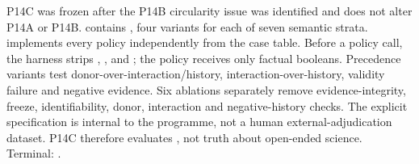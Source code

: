 \markdownRendererDocumentBegin
\markdownRendererSectionBegin
{}\markdownRendererInterblockSeparator
{}P14C was frozen after the P14B circularity issue was identified and does not alter P14A or P14B.\markdownRendererInterblockSeparator
{}\markdownRendererUlBeginTight
\markdownRendererUlItem {} contains , four variants for each of seven semantic strata.\markdownRendererUlItemEnd 
\markdownRendererUlItem {} implements every policy independently from the case table.\markdownRendererUlItemEnd 
\markdownRendererUlItem Before a policy call, the harness strips , ,  and ; the policy receives only factual booleans.\markdownRendererUlItemEnd 
\markdownRendererUlItem Precedence variants test donor-over-interaction/history, interaction-over-history, validity failure and negative evidence.\markdownRendererUlItemEnd 
\markdownRendererUlItem Six ablations separately remove evidence-integrity, freeze, identifiability, donor, interaction and negative-history checks.\markdownRendererUlItemEnd 
\markdownRendererUlEndTight \markdownRendererInterblockSeparator
{}The explicit specification is internal to the programme, not a human external-adjudication dataset. P14C therefore evaluates , not truth about open-ended science.\markdownRendererInterblockSeparator
{}Terminal: .\markdownRendererInterblockSeparator
{}\markdownRendererInterblockSeparator
